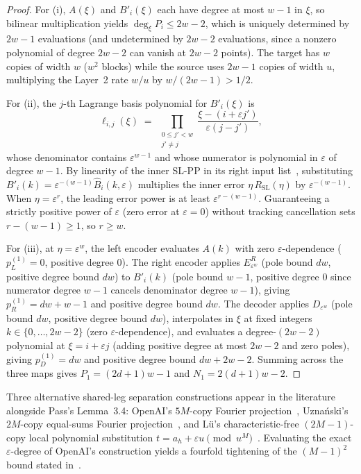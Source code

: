 \documentclass[11pt,a4paper]{article}
\theoremstyle{plain}
\theoremstyle{definition}
\theoremstyle{remark}
\begin{document}
\begin{proof}
For (i), $A(\xi)$ and $B'_i(\xi)$ each have degree at most $w - 1$ in $\xi$, so bilinear multiplication yields $\deg_\xi P_i \le 2w - 2$, which is uniquely determined by $2w - 1$ evaluations (and undetermined by $2w - 2$ evaluations, since a nonzero polynomial of degree $2w - 2$ can vanish at $2w - 2$ points). The target has $w$ copies of width $w$ ($w^2$ blocks) while the source uses $2w - 1$ copies of width $u$, multiplying the Layer~2 rate $w/u$ by $w/(2w - 1) > 1/2$.

For (ii), the $j$-th Lagrange basis polynomial for $B'_i(\xi)$ is
\begin{equation}
    \ell_{i,j}(\xi) \;=\; \prod_{\substack{0 \le j' < w \\ j' \neq j}} \frac{\xi - (i + \varepsilon j')}{\varepsilon(j - j')} ,
    \label{eq:lagrange_basis}
\end{equation}
whose denominator contains $\varepsilon^{w-1}$ and whose numerator is polynomial in $\varepsilon$ of degree $w - 1$. By linearity of the inner SL-PP in its right input list~\cite[Lemma~A.1]{Pass2026}, substituting $B'_i(k) = \varepsilon^{-(w-1)} \widehat{B}_i(k, \varepsilon)$ multiplies the inner error $\eta \, R_{\mathrm{SL}}(\eta)$ by $\varepsilon^{-(w-1)}$. When $\eta = \varepsilon^r$, the leading error power is at least $\varepsilon^{r - (w - 1)}$. Guaranteeing a strictly positive power of $\varepsilon$ (zero error at $\varepsilon = 0$) without tracking cancellation sets $r - (w - 1) \ge 1$, so $r \ge w$.

For (iii), at $\eta = \varepsilon^w$, the left encoder evaluates $A(k)$ with zero $\varepsilon$-dependence ($p_L^{(1)} = 0$, positive degree $0$). The right encoder applies $E_{\varepsilon^w}^R$ (pole bound $dw$, positive degree bound $dw$) to $B'_i(k)$ (pole bound $w - 1$, positive degree $0$ since numerator degree $w - 1$ cancels denominator degree $w - 1$), giving $p_R^{(1)} = dw + w - 1$ and positive degree bound $dw$. The decoder applies $D_{\varepsilon^w}$ (pole bound $dw$, positive degree bound $dw$), interpolates in $\xi$ at fixed integers $k \in \{0, \dots, 2w - 2\}$ (zero $\varepsilon$-dependence), and evaluates a degree-$(2w - 2)$ polynomial at $\xi = i + \varepsilon j$ (adding positive degree at most $2w - 2$ and zero poles), giving $p_D^{(1)} = dw$ and positive degree bound $dw + 2w - 2$. Summing across the three maps gives $P_1 = (2d + 1)w - 1$ and $N_1 = 2(d + 1)w - 2$.
\end{proof}

Three alternative shared-leg separation constructions appear in the literature alongside Pass's Lemma~3.4: OpenAI's $5M$-copy Fourier projection~\cite[Proposition~3.1]{OpenAI2026Upper}, Uzna\'nski's $2M$-copy equal-sums Fourier projection~\cite[Appendix~C]{Uznanski2026}, and L\"u's characteristic-free $(2M - 1)$-copy local polynomial substitution $t = a_h + \varepsilon u \pmod{u^M}$~\cite[Proposition~2.1]{Lu2026}. Evaluating the exact $\varepsilon$-degree of OpenAI's construction yields a fourfold tightening of the $(M - 1)^2$ bound stated in~\cite{OpenAI2026Upper}.
\end{document}
